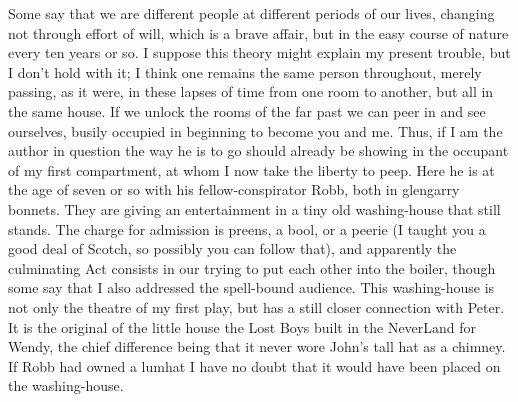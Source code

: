 Some say that we are different people at different periods of our lives,
changing not through effort of will, which is a brave affair,
but in the easy course of nature every ten years or so.
I suppose this theory might explain my present trouble, but I don’t hold with it;
I think one remains the same person throughout,
merely passing, as it were, in these lapses of time from one room to another,
but all in the same house.
If we unlock the rooms of the far past we can peer in and see ourselves,
busily occupied in beginning to become you and me.
Thus, if I am the author in question
the way he is to go should already be showing in the occupant of my first compartment,
at whom I now take the liberty to peep.
Here he is at the age of seven or so with his fellow-conspirator Robb, both in glengarry bonnets.
They are giving an entertainment in a tiny old washing-house that still stands.
The charge for admission is preens, a bool, or a peerie
(I taught you a good deal of Scotch, so possibly you can follow that),
and apparently the culminating Act consists in our trying to put each other into the boiler,
though some say that I also addressed the spell-bound audience.
This washing-house is not only the theatre of my first play,
but has a still closer connection with Peter.
It is the original of the little house the Lost Boys built in the NeverLand for Wendy,
the chief difference being that it never wore John’s tall hat as a chimney.
If Robb had owned a lumhat I have no doubt that it would have been placed on the washing-house.

